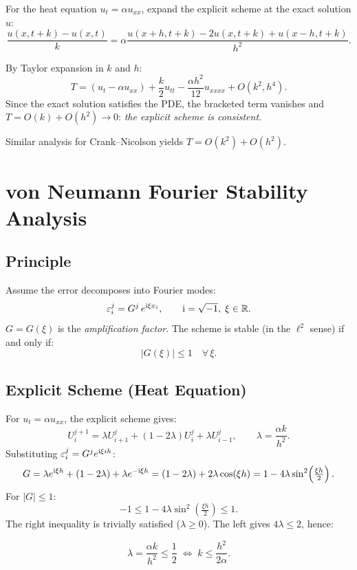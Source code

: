 \documentclass[12pt,a4paper]{article}
\theoremstyle{plain}
\theoremstyle{definition}
\theoremstyle{remark}
\newcommand{\OO}[1]{O\!\left(#1\right)}
\begin{document}
For the heat equation $u_{t}=\alpha u_{xx}$, expand the explicit scheme
at the exact solution $u$:
\[
  \frac{u(x,t+k)-u(x,t)}{k}
  =\alpha\frac{u(x+h,t+k)-2u(x,t+k)+u(x-h,t+k)}{h^{2}}.
\]

By Taylor expansion in $k$ and $h$:
\[
  T=\left(u_{t}-\alpha u_{xx}\right)
  +\frac{k}{2}u_{tt}-\frac{\alpha h^{2}}{12}u_{xxxx}+\OO{k^{2},h^{4}}.
\]
Since the exact solution satisfies the PDE, the bracketed term vanishes
and $T=\OO{k}+\OO{h^{2}}\to0$: \emph{the explicit scheme is consistent}.

Similar analysis for Crank--Nicolson yields $T=\OO{k^{2}}+\OO{h^{2}}$.

\section{von Neumann Fourier Stability Analysis}

\subsection{Principle}

Assume the error decomposes into Fourier modes:
\[
  \varepsilon_{i}^{j}=G^{j}\,e^{{\rm i}\xi x_{i}},
  \qquad{\rm i}=\sqrt{-1},\;\xi\in\mathbb{R}.
\]
$G=G(\xi)$ is the \emph{amplification factor}.  The scheme is stable
(in the $\ell^{2}$ sense) if and only if:
\[
  |G(\xi)|\leq1\quad\forall\,\xi.
\]

\subsection{Explicit Scheme (Heat Equation)}

For $u_{t}=\alpha u_{xx}$, the explicit scheme gives:
\[
  U_{i}^{j+1}=\lambda U_{i+1}^{j}+(1-2\lambda)U_{i}^{j}+\lambda U_{i-1}^{j},
  \qquad\lambda=\frac{\alpha k}{h^{2}}.
\]
Substituting $\varepsilon_{i}^{j}=G^{j}e^{{\rm i}\xi ih}$:
\[
  G=\lambda e^{{\rm i}\xi h}+(1-2\lambda)+\lambda e^{-{\rm i}\xi h}
   =(1-2\lambda)+2\lambda\cos(\xi h)
   =1-4\lambda\sin^{2}\!\left(\tfrac{\xi h}{2}\right).
\]
For $|G|\leq1$:
\[
  -1\leq1-4\lambda\sin^{2}\!\left(\tfrac{\xi h}{2}\right)\leq1.
\]
The right inequality is trivially satisfied ($\lambda\geq0$).  The left
gives $4\lambda\leq2$, hence:

\begin{keybox}
\begin{equation}\label{eq:CFL}
  \lambda=\frac{\alpha k}{h^{2}}\leq\frac{1}{2}
  \;\Longleftrightarrow\; k\leq\frac{h^{2}}{2\alpha}.
\end{equation}
\end{keybox}
\end{document}
